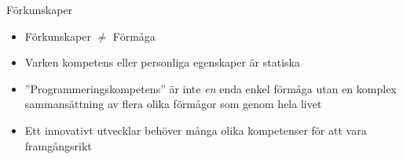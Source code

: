 


\fi


\ifkompendium\else

\begin{SlideExtra}{Förkunskaper}
\begin{itemize}
\item Förkunskaper $\neq$ Förmåga
\item Varken kompetens eller personliga egenskaper är statiska
\item ''Programmeringskompetens'' är inte \textit{en} enda enkel förmåga utan en komplex sammansättning av flera olika förmågor som  genom hela livet
\item Ett innovativt utvecklar behöver många olika kompetenser för att vara framgångsrikt
\end{itemize}
\end{SlideExtra}



